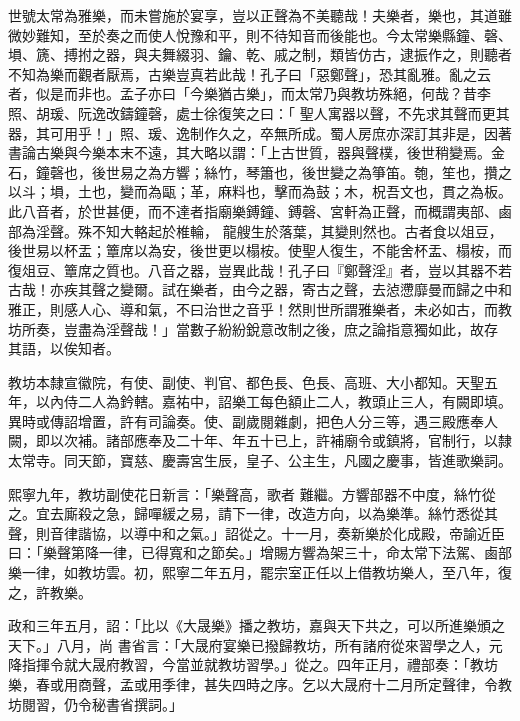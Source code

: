 \begin{pinyinscope}
 世號太常為雅樂，而未嘗施於宴享，豈以正聲為不美聽哉！夫樂者，樂也，其道雖微妙難知，至於奏之而使人悅豫和平，則不待知音而後能也。今太常樂縣鐘、磬、塤、篪、搏拊之器，與夫舞綴羽、鑰、乾、戚之制，類皆仿古，逮振作之，則聽者不知為樂而觀者厭焉，古樂豈真若此哉！孔子曰「惡鄭聲」，恐其亂雅。亂之云者，似是而非也。孟子亦曰「今樂猶古樂」，而太常乃與教坊殊絕，何哉？昔李照、胡瑗、阮逸改鑄鐘磬，處士徐復笑之曰：「
 聖人寓器以聲，不先求其聲而更其器，其可用乎！」照、瑗、逸制作久之，卒無所成。蜀人房庶亦深訂其非是，因著書論古樂與今樂本末不遠，其大略以謂：「上古世質，器與聲樸，後世稍變焉。金石，鐘磬也，後世易之為方響；絲竹，琴簫也，後世變之為箏笛。匏，笙也，攢之以斗；塤，土也，變而為甌；革，麻料也，擊而為鼓；木，柷吾文也，貫之為板。此八音者，於世甚便，而不達者指廟樂鎛鐘、鎛磬、宮軒為正聲，而概謂夷部、鹵部為淫聲。殊不知大輅起於椎輪，
 龍艘生於落葉，其變則然也。古者食以俎豆，後世易以杯盂；簟席以為安，後世更以榻桉。使聖人復生，不能舍杯盂、榻桉，而復俎豆、簟席之質也。八音之器，豈異此哉！孔子曰『鄭聲淫』者，豈以其器不若古哉！亦疾其聲之變爾。試在樂者，由今之器，寄古之聲，去惉懘靡曼而歸之中和雅正，則感人心、導和氣，不曰治世之音乎！然則世所謂雅樂者，未必如古，而教坊所奏，豈盡為淫聲哉！」當數子紛紛銳意改制之後，庶之論指意獨如此，故存
 其語，以俟知者。



 教坊本隸宣徽院，有使、副使、判官、都色長、色長、高班、大小都知。天聖五年，以內侍二人為鈐轄。嘉祐中，詔樂工每色額止二人，教頭止三人，有闕即填。異時或傳詔增置，許有司論奏。使、副歲閱雜劇，把色人分三等，遇三殿應奉人闕，即以次補。諸部應奉及二十年、年五十已上，許補廟令或鎮將，官制行，以隸太常寺。同天節，寶慈、慶壽宮生辰，皇子、公主生，凡國之慶事，皆進歌樂詞。



 熙寧九年，教坊副使花日新言：「樂聲高，歌者
 難繼。方響部器不中度，絲竹從之。宜去廝殺之急，歸嘽緩之易，請下一律，改造方向，以為樂準。絲竹悉從其聲，則音律諧協，以導中和之氣。」詔從之。十一月，奏新樂於化成殿，帝諭近臣曰：「樂聲第降一律，已得寬和之節矣。」增賜方響為架三十，命太常下法駕、鹵部樂一律，如教坊雲。初，熙寧二年五月，罷宗室正任以上借教坊樂人，至八年，復之，許教樂。



 政和三年五月，詔：「比以《大晟樂》播之教坊，嘉與天下共之，可以所進樂頒之天下。」八月，尚
 書省言：「大晟府宴樂已撥歸教坊，所有諸府從來習學之人，元降指揮令就大晟府教習，今當並就教坊習學。」從之。四年正月，禮部奏：「教坊樂，春或用商聲，孟或用季律，甚失四時之序。乞以大晟府十二月所定聲律，令教坊閱習，仍令秘書省撰詞。」




\end{pinyinscope}
